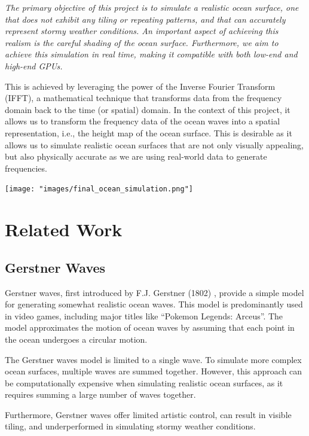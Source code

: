 \textit{The primary objective of this project is to simulate a realistic ocean surface, one that does not exhibit any tiling or repeating patterns, and that can accurately represent stormy weather conditions. An important aspect of achieving this realism is the careful shading of the ocean surface. Furthermore, we aim to achieve this simulation in real time, making it compatible with both low-end and high-end GPUs.}

This is achieved by leveraging the power of the Inverse Fourier Transform (IFFT), a mathematical technique that transforms data 
from the frequency domain back to the time (or spatial) domain. In the context of this project, 
it allows us to transform the frequency data of the ocean waves into a spatial representation, i.e., the height map of the ocean surface. This is
desirable as it allows us to simulate realistic ocean surfaces that are not only visually appealing, but also physically accurate as 
we are using real-world data to generate frequencies.

\begin{minipage}{1\textwidth}
    \centering
    \texttt{[image: "images/final\_ocean\_simulation.png"]}
    \label{fig:ocean_simulation}
\end{minipage}

\section{Related Work}

\subsection{Gerstner Waves}
Gerstner waves, first introduced by F.J. Gerstner (1802) \cite{Franz1809}, provide a simple model for generating somewhat realistic ocean waves. This model is predominantly used in video games, including major titles like “Pokemon Legends: Arceus”. The model approximates the motion of ocean waves by assuming that each point in the ocean undergoes a circular motion. 

The Gerstner waves model is limited to a single wave. To simulate more complex ocean surfaces, multiple waves are summed together. However, this approach can be computationally expensive when simulating realistic ocean surfaces, as it requires summing a large number of waves together. 

Furthermore, Gerstner waves offer limited artistic control, can result in visible tiling, and underperformed in simulating stormy weather conditions.

